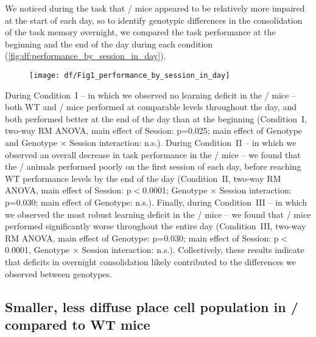 We noticed during the task that \df/ mice appeared to be relatively more impaired at the start of each day, so to identify genotypic differences in the consolidation of the task memory overnight, we compared the task performance at the beginning and the end of the day during each condition (\autoref{fig:df:performance_by_session_in_day}).
\begin{figure}
	\centering
	\texttt{[image: df/Fig1\_performance\_by\_session\_in\_day]}
	\caption{}
	\label{fig:df:performance_by_session_in_day}
\end{figure}
During Condition~I -- in which we observed no learning deficit in the \df/ mice -- both WT and \df/ mice performed at comparable levels throughout the day, and both performed better at the end of the day than at the beginning (Condition~I, two-way RM ANOVA, main effect of Session: p=0.025; main effect of Genotype and Genotype $\times$ Session interaction: n.s.). During Condition~II -- in which we observed an overall decrease in task performance in the \df/ mice --  we found that the \df/ animals performed poorly on the first session of each day, before reaching WT performance levels by the end of the day (Condition~II, two-way RM ANOVA, main effect of Session: p$<$0.0001; Genotype $\times$ Session interaction: p=0.030; main effect of Genotype: n.s.). Finally, during Condition~III -- in which we observed the most robust learning deficit in the \df/ mice -- we found that \df/ mice performed significantly worse throughout the entire day (Condition~III, two-way RM ANOVA, main effect of Genotype: p=0.030; main effect of Session: p$<$0.0001, Genotype $\times$ Session interaction: n.s.). Collectively, these results indicate that deficits in overnight consolidation likely contributed to the differences we observed between genotypes.

\subsection{Smaller, less diffuse place cell population in \df/ compared to WT mice}

